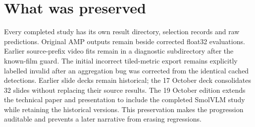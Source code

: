 \section{What was preserved}
Every completed study has its own result directory, selection records and raw predictions. Original AMP outputs remain beside corrected float32 evaluations. Earlier source-prefix video fits remain in a diagnostic subdirectory after the known-film guard. The initial incorrect tiled-metric export remains explicitly labelled invalid after an aggregation bug was corrected from the identical cached detections. Earlier slide decks remain historical; the 17 October deck consolidates 32 slides without replacing their source results. The 19 October edition extends the technical paper and presentation to include the completed SmolVLM study while retaining the historical versions. This preservation makes the progression auditable and prevents a later narrative from erasing regressions.
